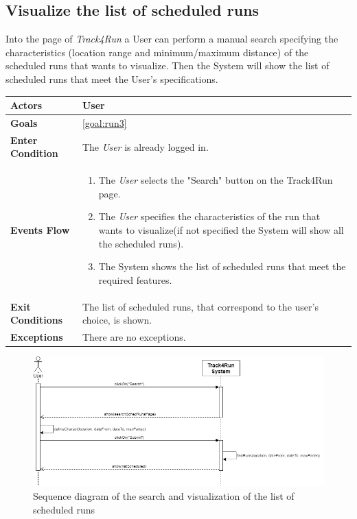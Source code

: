  \subsection{Visualize the list of scheduled runs}
Into the page of \emph{Track4Run} a User can perform a manual search specifying the characteristics (location range and minimum/maximum distance) of the scheduled runs that wants to visualize. Then the System will show the list of scheduled runs that meet the User's specifications. 

\begin{table}[H]
	\centering
    
    \begin{tabular}{|p{3.5cm}|p{10.3cm}|}
    
    \hline
    \textbf{\large{Actors}}  			& \tabitem User 	\\
    				 					
    \hline
    \textbf{\large{Goals}} 				& \ref{goal:run3}\\
    
    \hline
    \textbf{\large{Enter Condition}}	& The \emph{User} is already logged in.		\\
    
    \hline
    \textbf{\large{Events Flow}}		& \begin{enumerate}[leftmargin=0.5cm]
            	                            \item The \emph{User} selects the "Search" button on the Track4Run page.
                                          	\item The \emph{User} specifies the characteristics of the run that wants to visualize(if not specified the System will show all the scheduled runs).  
                                          	 \item The System shows the list of scheduled runs that meet the required features.
                                          \end{enumerate}
    										\\
    \hline
    \textbf{\large{Exit Conditions}}    & The list of scheduled runs, that correspond to the user's choice, is shown.  \\
    
    \hline
    \textbf{\large{Exceptions}} 		& There are no exceptions.\\
    
    \hline
    
    
    \end{tabular}
	
\end{table}

\begin{figure}[H]
    \centering
    \includegraphics[scale=0.4]{Pictures/visListSchedRunsSeqDiag.png}
    \caption{Sequence diagram of the search and visualization of the list of scheduled runs}
\end{figure}
